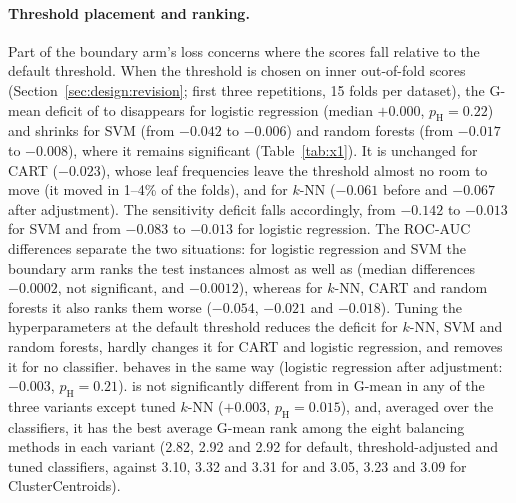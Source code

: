 \paragraph{Threshold placement and ranking.} Part of the boundary arm's loss concerns where the scores fall relative to the default threshold. When the threshold is chosen on inner out-of-fold scores (Section~\ref{sec:design:revision}; first three repetitions, 15 folds per dataset), the G-mean deficit of \MUSBS{} to \RUS{} disappears for logistic regression (median $+0.000$, $p_\mathrm{H}=0.22$) and shrinks for SVM (from $-0.042$ to $-0.006$) and random forests (from $-0.017$ to $-0.008$), where it remains significant (Table~\ref{tab:x1}). It is unchanged for CART ($-0.023$), whose leaf frequencies leave the threshold almost no room to move (it moved in 1--4\% of the folds), and for $k$-NN ($-0.061$ before and $-0.067$ after adjustment). The sensitivity deficit falls accordingly, from $-0.142$ to $-0.013$ for SVM and from $-0.083$ to $-0.013$ for logistic regression. The ROC-AUC differences separate the two situations: for logistic regression and SVM the boundary arm ranks the test instances almost as well as \RUS{} (median differences $-0.0002$, not significant, and $-0.0012$), whereas for $k$-NN, CART and random forests it also ranks them worse ($-0.054$, $-0.021$ and $-0.018$). Tuning the hyperparameters at the default threshold reduces the deficit for $k$-NN, SVM and random forests, hardly changes it for CART and logistic regression, and removes it for no classifier. \MUSBO{} behaves in the same way (logistic regression after adjustment: $-0.003$, $p_\mathrm{H}=0.21$). \MUSCS{} is not significantly different from \RUS{} in G-mean in any of the three variants except tuned $k$-NN ($+0.003$, $p_\mathrm{H}=0.015$), and, averaged over the classifiers, it has the best average G-mean rank among the eight balancing methods in each variant (2.82, 2.92 and 2.92 for default, threshold-adjusted and tuned classifiers, against 3.10, 3.32 and 3.31 for \RUS{} and 3.05, 3.23 and 3.09 for ClusterCentroids).


